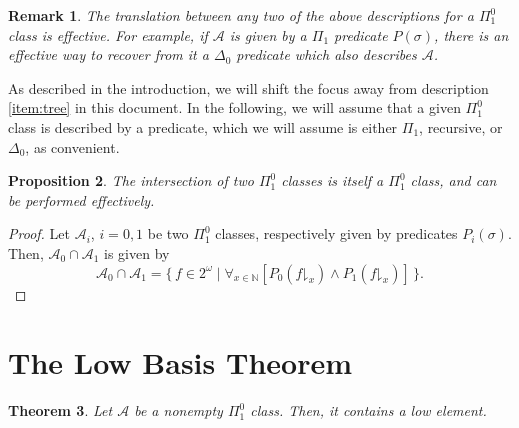 \documentclass{article}
\newtheorem{theorem}{Theorem}[section]
\newtheorem{prop}[theorem]{Proposition}
\newtheorem{remark}[theorem]{Remark}
\theoremstyle{nonumberplain}
\newtheorem{proof}{Proof}
\newcommand{\N}{\mathbb{N}}
\newcommand{\cl}[1]{\mathcal{#1}}
\newcommand{\take}[2]{#1\mathord{\downharpoonright}_{#2}}
\begin{document}
\begin{remark}
The translation between any two of the above descriptions for a $\Pi^0_1$ class is effective. For example, if $\cl A$ is given by a $\Pi_1$ predicate $P(\sigma)$, there is an effective way to recover from it a $\Delta_0$ predicate which also describes $\cl A$.
\end{remark}

As described in the introduction, we will shift the focus away from description \ref{item:tree} in this document. In the following, we will assume that a given $\Pi^0_1$ class is described by a predicate, which we will assume is either $\Pi_1$, recursive, or $\Delta_0$, as convenient.

\begin{prop}
The intersection of two $\Pi^0_1$ classes is itself a $\Pi^0_1$ class, and can be performed effectively.
\end{prop}

\begin{proof}
Let $\cl A_i$, $i = 0,1$ be two $\Pi^0_1$ classes, respectively given by predicates $P_i(\sigma)$. Then, $\cl A_0 \cap \cl A_1$ is given by
\begin{equation}
\cl A_0 \cap \cl A_1 = \{\, f \in 2^\omega \mid \forall_{x \in \N} \left[ P_0(\take f x) \land P_1(\take f x) \right] \,\}.
\end{equation}
\end{proof}

\section{The Low Basis Theorem}

\begin{theorem}
Let $\cl A$ be a nonempty $\Pi^0_1$ class. Then, it contains a low element.
\end{theorem}
\end{document}
